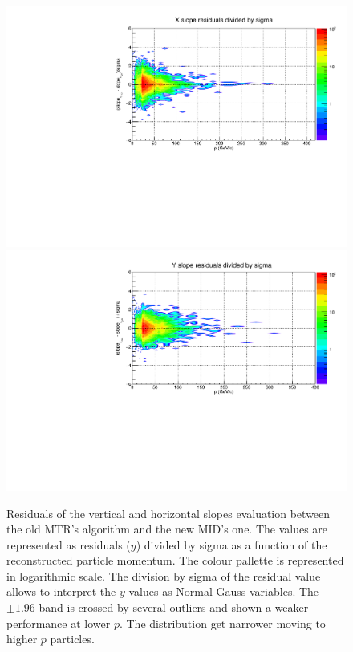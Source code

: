 \begin{figure}[]
\begin{center}
\includegraphics[width=0.99\linewidth]{Chapters/O2/Figs/TRmx_sigma.pdf}
\includegraphics[width=0.99\linewidth]{Chapters/O2/Figs/TRmy_sigma.pdf}
\caption{Residuals of the vertical and horizontal slopes evaluation between the old MTR's algorithm and the new MID's one. The values are represented as residuals ($y$) divided by sigma as a function of the reconstructed particle momentum. The colour pallette is represented in logarithmic scale. The division by sigma of the residual value allows to interpret the $y$ values as Normal Gauss variables. The $\pm1.96$ band is crossed by several outliers and shown a weaker performance at lower $p$. The distribution get narrower moving to higher $p$ particles.}
\label{fig:MID_TRm}
\end{center}
\end{figure}

